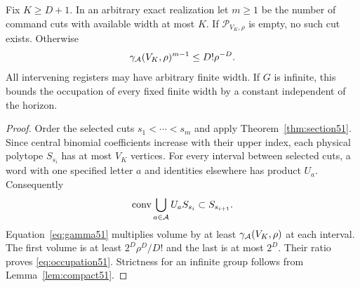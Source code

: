 \begin{theorem}\label{thm:occupation51}
Fix $K\ge D+1$. In an arbitrary exact realization let $m\ge1$ be
the number of command cuts with available width at most $K$.
If $\mathscr P_{V_K,\rho}$ is empty, no such cut exists. Otherwise
\begin{equation}\label{eq:occupation51}
 \gamma_{\mathcal A}(V_K,\rho)^{m-1}\le D!\rho^{-D}.
\end{equation}
All intervening registers may have arbitrary finite width. If $G$ is
infinite, this bounds the occupation of every fixed finite width by a
constant independent of the horizon.
\end{theorem}
\begin{proof}
Order the selected cuts $s_1<\cdots<s_m$ and apply
Theorem~\ref{thm:section51}. Since central binomial coefficients
increase with their upper index, each physical polytope $S_{s_i}$
has at most $V_K$ vertices. For every interval between selected cuts,
a word with one specified letter $a$ and identities elsewhere has
product $U_a$. Consequently
\[
 \operatorname{conv}\bigcup_{a\in\mathcal A}U_aS_{s_i}\subset S_{s_{i+1}}.
\]
Equation~\eqref{eq:gamma51} multiplies volume by at least
$\gamma_{\mathcal A}(V_K,\rho)$ at each interval. The first volume is at
least $2^D\rho^D/D!$ and the last is at most $2^D$.
Their ratio proves \eqref{eq:occupation51}. Strictness for an infinite
group follows from Lemma~\ref{lem:compact51}.
\end{proof}

